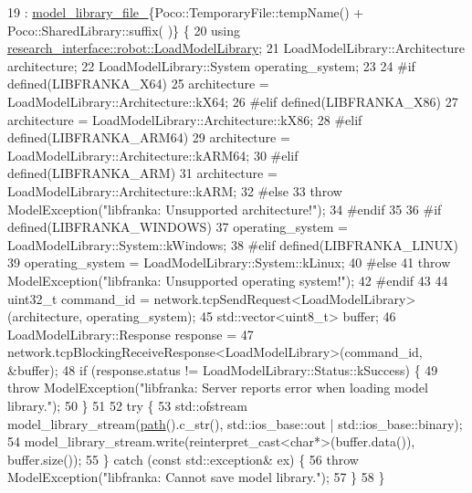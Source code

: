 \begin{DoxyCode}
19     : \hyperlink{classfranka_1_1LibraryDownloader_a40ea4c7b49484ed554b915e4d1df24f7}{model\_library\_file\_}\{Poco::TemporaryFile::tempName() + Poco::SharedLibrary::suffix(
      )\} \{
20   \textcolor{keyword}{using} \hyperlink{structresearch__interface_1_1robot_1_1LoadModelLibrary}{research\_interface::robot::LoadModelLibrary};
21   LoadModelLibrary::Architecture architecture;
22   LoadModelLibrary::System operating\_system;
23 
24 \textcolor{preprocessor}{#if defined(LIBFRANKA\_X64)}
25   architecture = LoadModelLibrary::Architecture::kX64;
26 \textcolor{preprocessor}{#elif defined(LIBFRANKA\_X86)}
27   architecture = LoadModelLibrary::Architecture::kX86;
28 \textcolor{preprocessor}{#elif defined(LIBFRANKA\_ARM64)}
29   architecture = LoadModelLibrary::Architecture::kARM64;
30 \textcolor{preprocessor}{#elif defined(LIBFRANKA\_ARM)}
31   architecture = LoadModelLibrary::Architecture::kARM;
32 \textcolor{preprocessor}{#else}
33   \textcolor{keywordflow}{throw} ModelException(\textcolor{stringliteral}{"libfranka: Unsupported architecture!"});
34 \textcolor{preprocessor}{#endif}
35 
36 \textcolor{preprocessor}{#if defined(LIBFRANKA\_WINDOWS)}
37   operating\_system = LoadModelLibrary::System::kWindows;
38 \textcolor{preprocessor}{#elif defined(LIBFRANKA\_LINUX)}
39   operating\_system = LoadModelLibrary::System::kLinux;
40 \textcolor{preprocessor}{#else}
41   \textcolor{keywordflow}{throw} ModelException(\textcolor{stringliteral}{"libfranka: Unsupported operating system!"});
42 \textcolor{preprocessor}{#endif}
43 
44   uint32\_t command\_id = network.tcpSendRequest<LoadModelLibrary>(architecture, operating\_system);
45   std::vector<uint8\_t> buffer;
46   LoadModelLibrary::Response response =
47       network.tcpBlockingReceiveResponse<LoadModelLibrary>(command\_id, &buffer);
48   \textcolor{keywordflow}{if} (response.status != LoadModelLibrary::Status::kSuccess) \{
49     \textcolor{keywordflow}{throw} ModelException(\textcolor{stringliteral}{"libfranka: Server reports error when loading model library."});
50   \}
51 
52   \textcolor{keywordflow}{try} \{
53     std::ofstream model\_library\_stream(\hyperlink{classfranka_1_1LibraryDownloader_ac33161b97cad34550de02c67f4feb15c}{path}().c\_str(), std::ios\_base::out | std::ios\_base::binary);
54     model\_library\_stream.write(reinterpret\_cast<char*>(buffer.data()), buffer.size());
55   \} \textcolor{keywordflow}{catch} (\textcolor{keyword}{const} std::exception& ex) \{
56     \textcolor{keywordflow}{throw} ModelException(\textcolor{stringliteral}{"libfranka: Cannot save model library."});
57   \}
58 \}
\end{DoxyCode}

